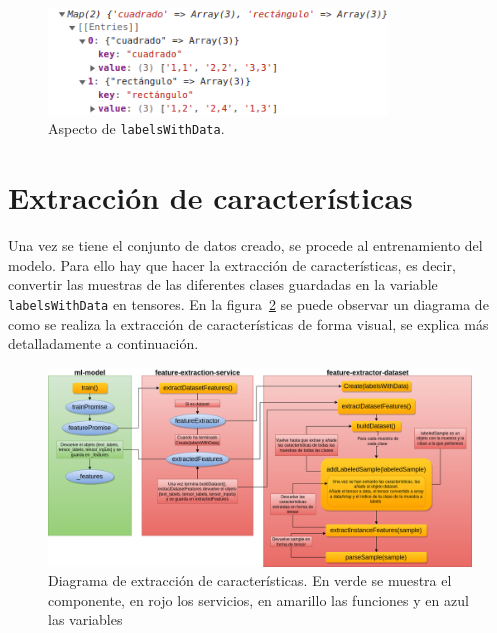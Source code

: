 \documentclass[a4paper, 12pt]{book}
\begin{document}
\begin{figure}
	\centering
	\includegraphics[width=9cm, keepaspectratio]{img/ejemplo1.png}
	\caption{Aspecto de \texttt{labelsWithData}.} 	\label{fig:ejemplo1}
\end{figure}


\section{Extracción de características}
\label{subsec:caracteristicas}

Una vez se tiene el conjunto de datos creado, se procede al entrenamiento del modelo. Para ello hay que hacer la extracción de características, es decir, convertir las muestras de las diferentes clases guardadas en la variable \texttt{labelsWithData} en tensores. En la figura~\ref{fig:extraccion_caract} se puede observar un diagrama de como se realiza la extracción de características de forma visual, se explica más detalladamente a continuación.

\begin{figure}
	\centering
	\includegraphics[width=17cm, keepaspectratio]{img/extraccion_de_caracteristicas.png}
	\caption{Diagrama de extracción de características. En verde se muestra el componente, en rojo los servicios, en amarillo las funciones y en azul las variables} 	\label{fig:extraccion_caract}
\end{figure}
\end{document}
